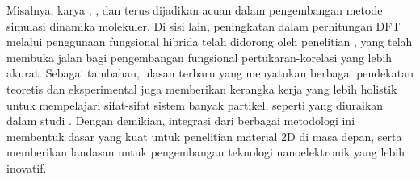Misalnya, karya \citep{Allen1989}, \citep{Rapaport2004}, dan \citep{Allen1989} terus dijadikan acuan dalam pengembangan metode simulasi dinamika molekuler.
Di sisi lain, peningkatan dalam perhitungan DFT melalui penggunaan fungsional hibrida telah didorong oleh penelitian \citep{Becke1993}, yang telah membuka jalan bagi pengembangan fungsional pertukaran-korelasi yang lebih akurat.
Sebagai tambahan, ulasan terbaru yang menyatukan berbagai pendekatan teoretis dan eksperimental juga memberikan kerangka kerja yang lebih holistik untuk mempelajari sifat-sifat sistem banyak partikel, seperti yang diuraikan dalam studi \citep{Lele2022}.
Dengan demikian, integrasi dari berbagai metodologi ini membentuk dasar yang kuat untuk penelitian material 2D di masa depan, serta memberikan landasan untuk pengembangan teknologi nanoelektronik yang lebih inovatif.
